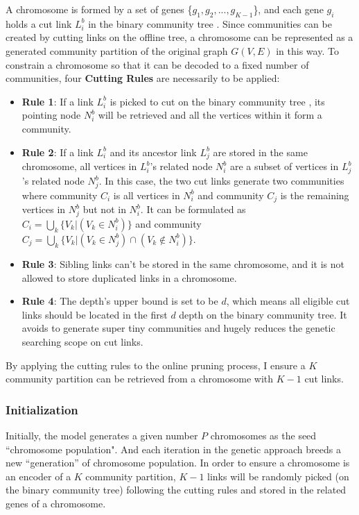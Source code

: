 A chromosome is formed by a set of genes \{$g_{1},g_{2},...,g_{K-1}$\}, and each gene $g_{i}$ holds a cut link $L_{i}^{b}$ in the binary community tree . Since communities can be created by cutting links on the offline tree, a chromosome can be represented as a generated community partition of the original graph $G(V,E)$ in this way. 
To constrain a chromosome so that it can be decoded to a fixed number of communities, four \textbf{Cutting Rules} are necessarily to be applied: 
\begin{itemize} %
	\item \textbf{ Rule 1}: If a link $L_{i}^{b}$ is picked to cut on the binary community tree , its pointing node $N_{i}^{b}$ will be retrieved and all the vertices within it form a community. 
	\item \textbf{ Rule 2}: If a link {$L_{i}^{b}$} and its ancestor link {$L_{j}^{b}$} are stored in the same chromosome, all vertices in {$L_{i}^{b}$}'s related node {$N_{i}^{b}$} are a subset of vertices in {$L_{j}^{b}$}'s related node {$N_{j}^{b}$}. In this case, the two cut links generate two communities where community $C_{i}$ is all vertices in $ N_{i}^{b}$ and community $C_{j}$ is the remaining vertices in $ N_{j}^{b}$ but not in $ N_{i}^{b}$. It can be formulated as   $C_{i} = \bigcup_{k}\{V_{k}|(V_{k}\in N_{i}^{b})\}$ and community $C_{j} = \bigcup_{k}\{V_{k}|(V_{k}\in N_{j}^{b}) \cap (V_{k}\notin N_{i}^{b})\}$.  
	\item \textbf{ Rule 3}: Sibling links can't be stored in the same chromosome, and it is not allowed to store duplicated links in a chromosome.
	\item \textbf{ Rule 4}: The depth's upper bound is set to be $d$, which means all eligible cut links should be located in the first $d$ depth on the binary community tree. It avoids to generate super tiny communities and hugely reduces the genetic searching scope on cut links.
\end{itemize} 

By applying the cutting rules to the online pruning process, I ensure a $K$ community partition can be retrieved from a chromosome with $K-1$ cut links.  


\subsubsection{Initialization}

Initially, the model generates a given number $P$  chromosomes as the seed ``chromosome population". And each iteration in the genetic approach breeds a new ``generation'' of chromosome population. In order to ensure a chromosome is an encoder of a $K$ community partition, $K-1$ links will be randomly picked (on the binary community tree) following the cutting rules and stored in the related genes of a chromosome. 

